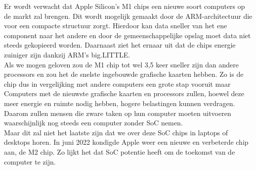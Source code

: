\documentclass{hogent-article}
\begin{document}

Er wordt verwacht dat Apple Silicon's M1 chips een nieuwe soort computers op de markt zal brengen. Dit wordt mogelijk gemaakt door de ARM-architectuur die voor een compacte structuur zorgt. Hierdoor kan data sneller van het ene component naar het andere en door de gemeenschappelijke opslag moet data niet steeds gekopieerd worden. Daarnaast ziet het ernaar uit dat de chips energie zuiniger zijn dankzij ARM's big.LITTLE. \\
Als we \textcite{Apple2020} mogen geloven zou de M1 chip tot wel 3,5 keer sneller zijn dan andere processors en zou het de snelste ingebouwde grafische kaarten hebben. Zo is de chip dus in vergelijking met andere computers een grote stap vooruit maar Computers met de nieuwste grafische kaarten en processors zullen, hoewel deze meer energie en ruimte nodig hebben, hogere belastingen kunnen verdragen. Daarom zullen mensen die zware taken op hun computer moeten uitvoeren waarschijnlijk nog steeds een computer zonder SoC nemen. \\
Maar dit zal niet het laatste zijn dat we over deze SoC chips in laptops of desktops horen. In juni 2022 kondigde Apple weer een nieuwe en verbeterde chip aan, de M2 chip. Zo lijkt het dat SoC potentie heeft om de toekomst van de computer te zijn.


\printbibliography[heading=bibintoc]
\end{document}
